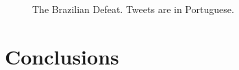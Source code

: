 \documentclass{sig-alternate}
\begin{document}
\begin{figure}[htp!]
\caption{The Brazilian Defeat. Tweets are in Portuguese.}
\label{fig:por}
\end{figure}


\section{Conclusions}
\end{document}
